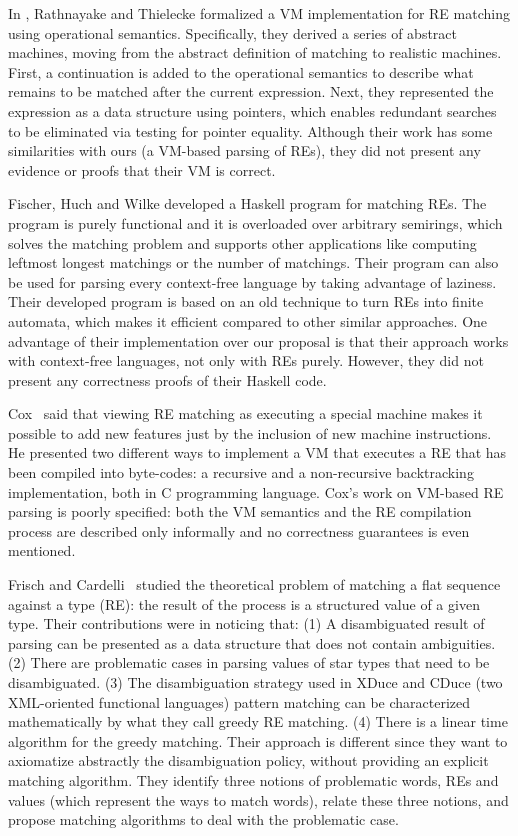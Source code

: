 \documentclass[sigplan]{acmart}
\theoremstyle{definition}
\begin{document}
In \cite{Rathnayake2011}, Rathnayake and Thielecke formalized a VM implementation for RE matching using
operational semantics. Specifically, they derived a series of abstract machines, moving from the abstract
definition of matching to realistic machines. First, a continuation is added to the operational semantics
to describe what remains to be matched after the current expression. Next, they represented the expression
as a data structure using pointers, which enables redundant searches to be eliminated via testing for pointer
equality. Although their work has some similarities with ours (a VM-based parsing of REs), they did not present
any evidence or proofs that their VM is correct.

Fischer, Huch and Wilke \cite{Fischer2010} developed a Haskell program for matching REs. The program is purely
functional and it is overloaded over arbitrary semirings, which solves the matching problem and supports other
applications like computing leftmost longest matchings or the number of matchings. Their program can also be used
for parsing every context-free language by taking advantage of laziness. Their developed program is based on an
old technique to turn REs into finite automata, which makes it efficient compared to other similar approaches.
One advantage of their implementation over our proposal is that their approach works with context-free languages,
not only with REs purely. However, they did not present any correctness proofs of their Haskell code.

Cox~\cite{Cox2009} said that viewing RE matching as executing a special machine makes it possible to add new
features just by the inclusion of new machine instructions. He presented two different ways to implement
a VM that executes a RE that has been compiled into  byte-codes: a recursive and a non-recursive
backtracking implementation, both in C programming language. Cox's work on VM-based RE parsing is poorly specified:
both the VM semantics and the RE compilation process are described only informally
and no correctness guarantees is even mentioned.

Frisch and Cardelli~\cite{Frisch2004} studied the theoretical problem of matching a flat sequence against a type (RE): the
result of the process is a structured value of a given type. Their contributions were in noticing that: (1) A disambiguated
result of parsing can be presented as a data structure that does not contain ambiguities. (2) There are problematic cases in
parsing values of star types that need to be disambiguated. (3) The disambiguation strategy used in XDuce and CDuce (two
XML-oriented functional languages) pattern matching can be characterized mathematically by what they call greedy RE matching.
(4) There is a linear time algorithm for the greedy matching. Their approach is different since they want to axiomatize abstractly
the disambiguation policy, without providing an explicit matching algorithm. They identify three notions of problematic words, REs
and values (which represent the ways to match words), relate these three notions, and propose matching algorithms to deal with the
problematic case.
\end{document}
